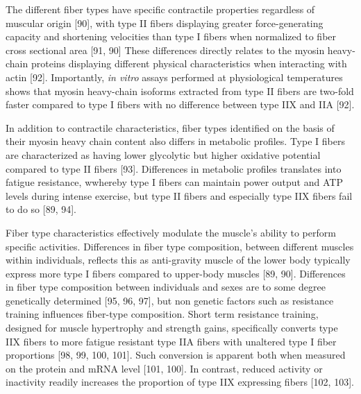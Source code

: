 \documentclass[twoside,10pt]{gihclass} %
\begin{document}
The different fiber types have specific contractile properties regardless of muscular origin
{[}90{]},
with type II fibers displaying greater force-generating capacity and shortening velocities than type I fibers when normalized to fiber cross sectional area
{[}91, 90{]}
These differences directly relates to the myosin heavy-chain proteins displaying different physical characteristics when interacting with actin
{[}92{]}.
Importantly, \emph{in vitro} assays performed at physiological temperatures shows that myosin heavy-chain isoforms extracted from type II fibers are two-fold faster compared to type I fibers with no difference between type IIX and IIA
{[}92{]}.

In addition to contractile characteristics, fiber types identified on the basis of their myosin heavy chain content also differs in metabolic profiles.
Type I fibers are characterized as having lower glycolytic but higher oxidative potential compared to type II fibers
{[}93{]}.
Differences in metabolic profiles translates into fatigue resistance, wwhereby type I fibers can maintain power output and ATP levels during intense exercise, but type II fibers and especially type IIX fibers fail to do so
{[}89, 94{]}.

Fiber type characteristics effectively modulate the muscle's ability to perform specific activities. Differences in fiber type composition, between different muscles within individuals, reflects this as anti-gravity muscle of the lower body typically express more type I fibers compared to upper-body muscles
{[}89, 90{]}.
Differences in fiber type composition between individuals and sexes are to some degree genetically determined
{[}95, 96, 97{]},
but non genetic factors such as resistance training influences fiber-type composition. Short term resistance training, designed for muscle hypertrophy and strength gains, specifically converts type IIX fibers to more fatigue resistant type IIA fibers with unaltered type I fiber proportions
{[}98, 99, 100, 101{]}.
Such conversion is apparent both when measured on the protein and mRNA level
{[}101, 100{]}.
In contrast, reduced activity or inactivity readily increases the proportion of type IIX expressing fibers
{[}102, 103{]}.
\end{document}
